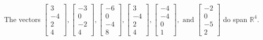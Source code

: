 \begin{exercise}
\begin{exerciseStatement}
  \end{exerciseStatement}
  \begin{exerciseAnswer}
   The vectors \(\left[\begin{array}{r}
3 \\
-4 \\
2 \\
4
\end{array}\right] , \left[\begin{array}{r}
-3 \\
0 \\
-2 \\
4
\end{array}\right] , \left[\begin{array}{r}
-6 \\
0 \\
-4 \\
8
\end{array}\right] , \left[\begin{array}{r}
3 \\
-4 \\
2 \\
4
\end{array}\right] , \left[\begin{array}{r}
-4 \\
-4 \\
0 \\
1
\end{array}\right] , \text{ and } \left[\begin{array}{r}
-2 \\
0 \\
-5 \\
2
\end{array}\right]\) 
  	 do  
	span \(\mathbb{R}^4\).
  


  \end{exerciseAnswer}
\end{exercise}